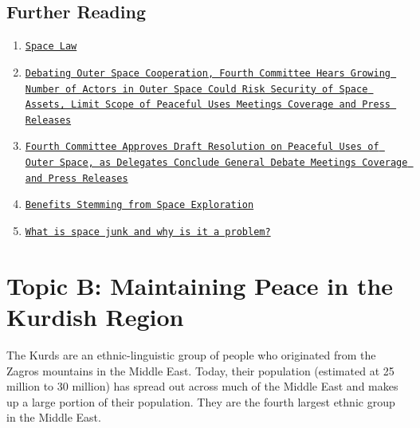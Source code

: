 \documentclass[10pt, letterpaper]{article}
\begin{document}
\subsection{Further Reading}

\begin{enumerate}
\def\labelenumi{\arabic{enumi}.}
\item
  
  \texttt{{\href{https://spacepolicyonline.com/topics/space-law/}{Space
  Law}}}
  
\item
  
 \texttt{{\href{https://www.un.org/press/en/2009/gaspd433.doc.htm}{Debating
  Outer Space Cooperation, Fourth Committee Hears Growing Number of
  Actors in Outer Space Could Risk Security of Space Assets, Limit Scope
  of Peaceful Uses Meetings Coverage and Press Releases}}}
  
\item
  
  \texttt{{\href{https://www.un.org/press/en/2019/gaspd705.doc.htm}{Fourth
  Committee Approves Draft Resolution on Peaceful Uses of Outer Space,
  as Delegates Conclude General Debate \textbar{} Meetings Coverage and
  Press Releases}}}
  
\item
  
  \texttt{{\href{https://www.nasa.gov/sites/default/files/files/Benefits-Stemming-from-Space-Exploration-2013-TAGGED.pdf}{Benefits
  Stemming from Space Exploration}}}
  
\item
  
  \texttt{{\href{https://www.nhm.ac.uk/discover/what-is-space-junk-and-why-is-it-a-problem.html}{What
  is space junk and why is it a problem?}}}
  
\end{enumerate}

\newpage
\section{Topic B: Maintaining Peace in the Kurdish Region}

The Kurds are an ethnic-linguistic group of people who originated from
the Zagros mountains in the Middle East. Today, their population
(estimated at 25 million to 30 million) has spread out across much of
the Middle East and makes up a large portion of their population. They
are the fourth largest ethnic group in the Middle East. \\
\end{document}
